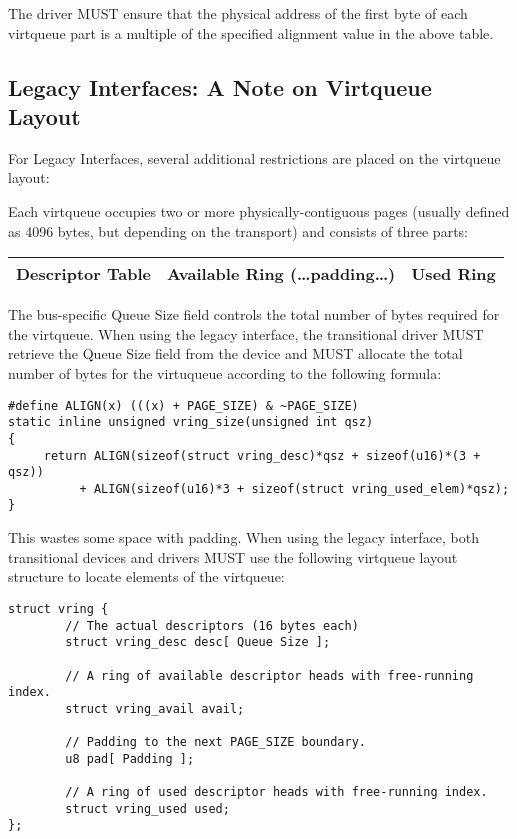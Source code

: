 The driver MUST ensure that the physical address of the first byte
of each virtqueue part is a multiple of the specified alignment value
in the above table.

\subsection{Legacy Interfaces: A Note on Virtqueue Layout}\label{sec:Basic Facilities of a Virtio Device / Virtqueues / Legacy Interfaces: A Note on Virtqueue Layout}

For Legacy Interfaces, several additional
restrictions are placed on the virtqueue layout:

Each virtqueue occupies two or more physically-contiguous pages
(usually defined as 4096 bytes, but depending on the transport)
and consists of three parts:

\begin{tabular}{|l|l|l|}
\hline
Descriptor Table & Available Ring (\ldots padding\ldots) & Used Ring \\
\hline
\end{tabular}

The bus-specific Queue Size field controls the total number of bytes
required for the virtqueue.
When using the legacy interface, the transitional
driver MUST retrieve the Queue Size field from the device
and MUST allocate the total number of bytes for the virtuqueue
according to the following formula:

\begin{lstlisting}
#define ALIGN(x) (((x) + PAGE_SIZE) & ~PAGE_SIZE)
static inline unsigned vring_size(unsigned int qsz)
{
     return ALIGN(sizeof(struct vring_desc)*qsz + sizeof(u16)*(3 + qsz))
          + ALIGN(sizeof(u16)*3 + sizeof(struct vring_used_elem)*qsz);
}
\end{lstlisting}

This wastes some space with padding.
When using the legacy interface, both transitional
devices and drivers MUST use the following virtqueue layout
structure to locate elements of the virtqueue:

\begin{lstlisting}
struct vring {
        // The actual descriptors (16 bytes each)
        struct vring_desc desc[ Queue Size ];

        // A ring of available descriptor heads with free-running index.
        struct vring_avail avail;

        // Padding to the next PAGE_SIZE boundary.
        u8 pad[ Padding ];

        // A ring of used descriptor heads with free-running index.
        struct vring_used used;
};
\end{lstlisting}

